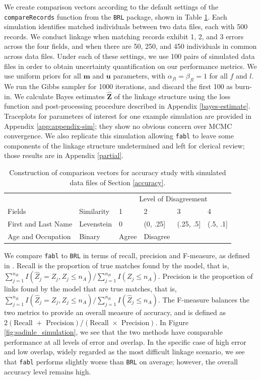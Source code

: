 \documentclass[ba]{imsart}
\begin{document}
	We create comparison vectors according to the default settings of the \texttt{compareRecords} function from the \texttt{BRL} package, shown in Table \ref{Tab:sadinle_simulation_cutoffs}. Each simulation identifies matched individuals between two data files, each with 500 records. We conduct linkage when matching records exhibit 1, 2, and 3 errors across the four fields, and when there are 50, 250, and 450 individuals in common across data files. Under each of these settings, we use 100 pairs of simulated data files in order to obtain uncertainty quantification on our performance metrics. We use uniform priors for all $\bm{m}$ and $\bm{u}$ parameters, with $\alpha_{fl} = \beta_{fl} = 1$ for all $f$ and $l$. We run the Gibbs sampler for 1000 iterations, and discard the first 100 as burn-in. We calculate Bayes estimates $\hat{\bm{Z}}$ of the linkage structure using the  loss function and post-processing procedure described in Appendix \ref{bayes-estimate}. Traceplots for parameters of interest for one example simulation are provided in Appendix \ref{app:appendix-sim}; they show no obvious concern over MCMC convergence. We also replicate this simulation allowing \texttt{fabl} to leave some components of the linkage structure undetermined and left for clerical review; those results are in Appendix \ref{partial}.
	
	\begin{table}[t]
		\centering
		\begin{tabular}[t]{llllll}
			
			\multicolumn{2}{c}{ } & \multicolumn{4}{c}{Level of Disagreement} \\
			\cline{3-6}
			Fields & Similarity & 1 & 2 & 3 & 4\\
			\hline
			First and Last Name & Levenstein & 0 & (0, .25] & (.25, .5] & (.5, .1]\\
			Age and Occupation & Binary & Agree & Disagree &  & \\
			\hline
		\end{tabular}
		\caption{Construction of comparison vectors for accuracy study with simulated data files of Section \ref{accuracy}.}
		\label{Tab:sadinle_simulation_cutoffs}
	\end{table}
	
	We compare \texttt{fabl} to \texttt{BRL} in terms of recall, precision and F-measure, as defined in \cite{christen_2012}. Recall is the proportion of true matches found by the model, that is, $\sum_{j=1}^{n_B} I(\hat{Z}_j = Z_j, Z_j \leq n_A) / \sum_{j=1}^{n_B} I(Z_j \leq n_A)$. Precision is the proportion of links found by the model that are true matches, that is, $\sum_{j=1}^{n_B} I(\hat{Z}_j = Z_j, Z_j \leq n_A) / \sum_{j=1}^{n_B} I(\hat{Z}_j \leq n_A)$. The F-measure balances the two metrics to provide an overall measure of accuracy, and is defined as $2  (\text{Recall } + \text{ Precision}) / (\text{Recall } \times \text{ Precision})$. In Figure \ref{fig:sadinle_simulation}, we see that the two methods have comparable performance at all levels of error and overlap. In the specific case of high error and low overlap, widely regarded as the most difficult linkage scenario, we see that \texttt{fabl} performs slightly worse than \texttt{BRL} on average; however, the overall accuracy level remains high. 
	
\end{document}
